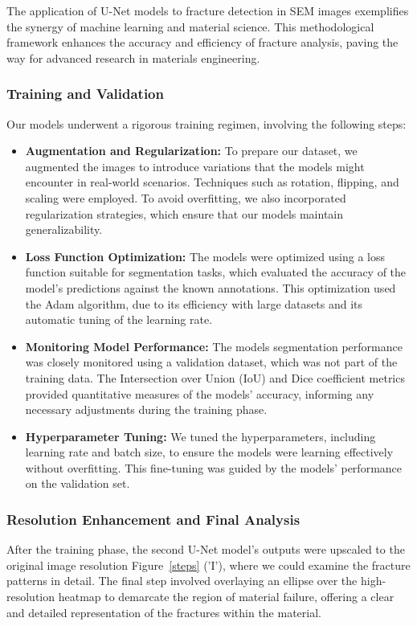 \documentclass[preprint,12pt]{elsarticle}
\begin{document}
The application of U-Net models to fracture detection in SEM images exemplifies the synergy of machine learning and material science. This methodological framework enhances the accuracy and efficiency of fracture analysis, paving the way for advanced research in materials engineering.




\subsubsection{Training and Validation}
Our models underwent a rigorous training regimen, involving the following steps:

\begin{itemize}
  \item \textbf{Augmentation and Regularization:} To prepare our dataset, we augmented the images to introduce variations that the models might encounter in real-world scenarios. Techniques such as rotation, flipping, and scaling were employed. To avoid overfitting, we also incorporated regularization strategies, which ensure that our models maintain generalizability.

  \item \textbf{Loss Function Optimization:} The models were optimized using a loss function suitable for segmentation tasks, which evaluated the accuracy of the model's predictions against the known annotations. This optimization used the Adam algorithm, due to its efficiency with large datasets and its automatic tuning of the learning rate.

  \item \textbf{Monitoring Model Performance:} The models segmentation performance was closely monitored using a validation dataset, which was not part of the training data. The Intersection over Union (IoU) and Dice coefficient metrics provided quantitative measures of the models' accuracy, informing any necessary adjustments during the training phase.

  \item \textbf{Hyperparameter Tuning:} We tuned the hyperparameters, including learning rate and batch size, to ensure the models were learning effectively without overfitting. This fine-tuning was guided by the models' performance on the validation set.

\end{itemize}

\subsubsection{Resolution Enhancement and Final Analysis}
After the training phase, the second U-Net model's outputs were upscaled to the original image resolution Figure~\ref{steps} ('I'), where we could examine the fracture patterns in detail. The final step involved overlaying an ellipse over the high-resolution heatmap to demarcate the region of material failure, offering a clear and detailed representation of the fractures within the material.
\end{document}
